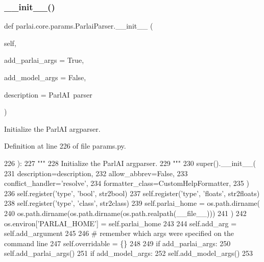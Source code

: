 \subsubsection{\texorpdfstring{\+\_\+\+\_\+init\+\_\+\+\_\+()}{\_\_init\_\_()}}
{\footnotesize\ttfamily def parlai.\+core.\+params.\+Parlai\+Parser.\+\_\+\+\_\+init\+\_\+\+\_\+ (\begin{DoxyParamCaption}\item[{}]{self,  }\item[{}]{add\+\_\+parlai\+\_\+args = {\ttfamily True},  }\item[{}]{add\+\_\+model\+\_\+args = {\ttfamily False},  }\item[{}]{description = {\ttfamily \textquotesingle{}ParlAI~parser\textquotesingle{}} }\end{DoxyParamCaption})}

\begin{DoxyVerb}Initialize the ParlAI argparser.
\end{DoxyVerb}
 

Definition at line 226 of file params.\+py.


\begin{DoxyCode}
226     ):
227         \textcolor{stringliteral}{"""}
228 \textcolor{stringliteral}{        Initialize the ParlAI argparser.}
229 \textcolor{stringliteral}{        """}
230         super().\_\_init\_\_(
231             description=description,
232             allow\_abbrev=\textcolor{keyword}{False},
233             conflict\_handler=\textcolor{stringliteral}{'resolve'},
234             formatter\_class=CustomHelpFormatter,
235         )
236         self.register(\textcolor{stringliteral}{'type'}, \textcolor{stringliteral}{'bool'}, str2bool)
237         self.register(\textcolor{stringliteral}{'type'}, \textcolor{stringliteral}{'floats'}, str2floats)
238         self.register(\textcolor{stringliteral}{'type'}, \textcolor{stringliteral}{'class'}, str2class)
239         self.parlai\_home = os.path.dirname(
240             os.path.dirname(os.path.dirname(os.path.realpath(\_\_file\_\_)))
241         )
242         os.environ[\textcolor{stringliteral}{'PARLAI\_HOME'}] = self.parlai\_home
243 
244         self.add\_arg = self.add\_argument
245 
246         \textcolor{comment}{# remember which args were specified on the command line}
247         self.overridable = \{\}
248 
249         \textcolor{keywordflow}{if} add\_parlai\_args:
250             self.add\_parlai\_args()
251         \textcolor{keywordflow}{if} add\_model\_args:
252             self.add\_model\_args()
253 
\end{DoxyCode}


